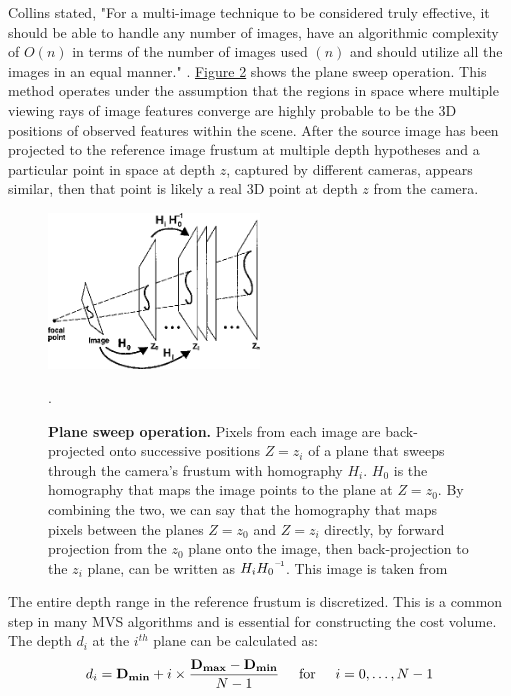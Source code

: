 Collins stated, "For a multi-image technique to be considered truly effective, it should be able to handle any number of images, have an algorithmic complexity of $O(n)$ in terms of the number of images used $(n)$ and should utilize all the images in an equal manner." \cite{Collins1996ASA}. \hyperref[fig:psw]{Figure 2} shows the plane sweep operation. This method operates under the assumption that the regions in space where multiple viewing rays of image features converge are highly probable to be the 3D positions of observed features within the scene. After the source image has been projected to the reference image frustum at multiple depth hypotheses and a particular point in space at depth $z$, captured by different cameras, appears similar, then that point is likely a real 3D point at depth $z$ from the camera.\par
\begin{figure}[h]
\centering
     \includegraphics[width=0.5\textwidth]{images/psw.png}
      \caption[Plane sweep operation]{\textbf{Plane sweep operation.} Pixels from each image are back-projected onto successive positions $Z = z_i$ of a plane that sweeps through the camera's frustum with homography $H_i$. $H_0$ is the homography that maps the image points to the plane at $Z = z_0$. By combining the two, we can say that the homography that maps pixels between the planes $Z = z_0$ and $Z = z_i$ directly, by forward projection from the $z_0$ plane onto the image, then back-projection to the $z_i$ plane, can be written as $H_i\inv{H_0}$. This image is taken from \cite{Collins1996ASA}}.
       \label{fig:psw}
\end{figure}
The entire depth range in the reference frustum is discretized. This is a common step in many MVS algorithms and is essential for constructing the cost volume. The depth $d_i$ at the $i^{th}$ plane can be calculated as:
\begin{equation}
    d_i = \mathbf{D_{min}} + i \times \frac{\mathbf{D_{max}-D_{min}}}{N-1} \hspace{0.5cm} \text{for} \hspace{0.5cm} i=0, \dots, N-1
\end{equation}\label{eq:dist-discrete}
